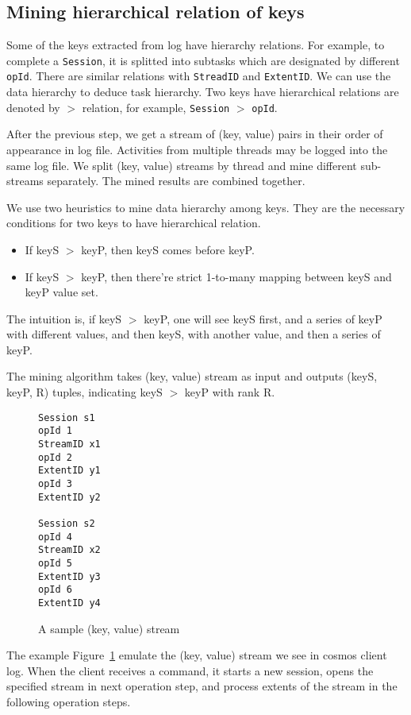 \subsection{Mining hierarchical relation of keys}

Some of the keys extracted from log have hierarchy
relations. For example, to complete a \texttt{Session}, it
is splitted into subtasks which are designated by different
\texttt{opId}. There are similar relations with
\texttt{StreadID} and \texttt{ExtentID}. We can use the data
hierarchy to deduce task hierarchy. Two keys have
hierarchical relations are denoted by $>$ relation, for
example, \texttt{Session} $>$ \texttt{opId}.

After the previous step, we get a stream of (key, value)
pairs in their order of appearance in log file. Activities
from multiple threads may be logged into the same log file.
We split (key, value) streams by thread and mine different
sub-streams separately. The mined results are combined
together.

We use two heuristics to mine data hierarchy among keys.
They are the necessary conditions for two keys to have
hierarchical relation.
\begin{itemize}
\item If keyS $>$ keyP, then keyS comes before keyP.
\item If keyS $>$ keyP, then there're strict 1-to-many
mapping between keyS and keyP value set.
\end{itemize}
The intuition is, if keyS $>$ keyP, one will see keyS first,
and a series of keyP with different values, and then keyS,
with another value, and then a series of keyP. 

The mining algorithm takes (key, value) stream as input and
outputs (keyS, keyP, R) tuples, indicating keyS $>$ keyP
with rank R.

\begin{figure}
\centering
\begin{verbatim}
Session s1
opId 1
StreamID x1
opId 2
ExtentID y1
opId 3
ExtentID y2

Session s2
opId 4
StreamID x2
opId 5
ExtentID y3
opId 6
ExtentID y4
\end{verbatim}
\caption{A sample (key, value) stream}
\label{fig:kvstream}
\end{figure}

The example Figure~\ref{fig:kvstream} emulate the (key,
value) stream we see in cosmos client log. When the client
receives a command, it starts a new session, opens the
specified stream in next operation step, and process extents
of the stream in the following operation steps.

